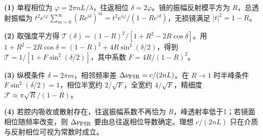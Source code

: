 \par\noindent\textbf{(1)} 单程相位为 \(\varphi=2\pi nL/\lambda\)，往返相位 \(\delta=2\varphi\)。镜的振幅反射模平方为 \(R\)，总透射振幅为 \(t^2 e^{i\varphi}\sum_{m=0}^{\infty}(Re^{i\delta})^m=t^2e^{i\varphi}/(1-Re^{i\delta})\)，无损镜满足 \(|t|^2=1-R\)。
\par\noindent\textbf{(2)} 取强度平方得 \(\mathcal T(\delta)=(1-R)^2/[1+R^2-2R\cos\delta]\)。用 \(1+R^2-2R\cos\delta=(1-R)^2+4R\sin^2(\delta/2)\)，得到 \(\mathcal T=1/[1+F\sin^2(\delta/2)]\)，其中系数 \(F=4R/(1-R)^2\)。
\par\noindent\textbf{(3)} 纵模条件 \(\delta=2\pi m\)，相邻频率差 \(\Delta\nu_{\rm FSR}=c/(2nL)\)。在 \(R\to1\) 时半峰条件 \(F\sin^2(\delta/2)=1\)，相位半宽约 \(2/\sqrt F\)，全宽约 \(4/\sqrt F\)，精细度 \(\mathcal F\approx\pi\sqrt R/(1-R)\)。
\par\noindent\textbf{(4)} 若腔内吸收或散射存在，往返振幅系数不再恰为 \(R\)，峰透射率低于1；若镜面相位随频率改变，则 \(\Delta\nu_{\rm FSR}\) 要由总往返相位导数确定。理想 \(c/(2nL)\) 只在介质与反射相位可视为常数时成立。
